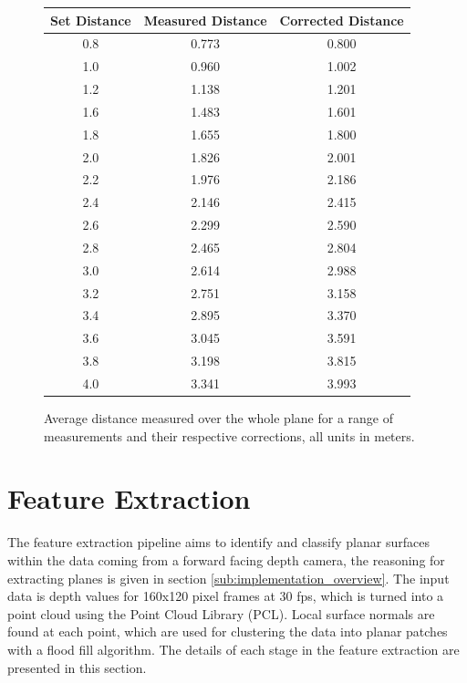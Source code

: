 \documentclass[]{article}
\begin{document}
{\begin{figure}[htb]
	\begin{center}
	\begin{tabular}{ccc}
		\hline

		\hline
		\textbf{Set Distance}& \textbf{Measured Distance}& \textbf{Corrected Distance} \\
		\hline
		0.8		& 0.773	& 0.800\\
		1.0		& 0.960	& 1.002\\
		1.2 	& 1.138	& 1.201\\
		1.6 	& 1.483	& 1.601\\
		1.8 	& 1.655	& 1.800\\
		2.0 	& 1.826	& 2.001\\
		2.2 	& 1.976	& 2.186\\
		2.4 	& 2.146	& 2.415\\
		2.6 	& 2.299	& 2.590\\
		2.8 	& 2.465	& 2.804\\
		3.0 	& 2.614	& 2.988\\
		3.2 	& 2.751	& 3.158\\
		3.4 	& 2.895	& 3.370\\
		3.6 	& 3.045	& 3.591\\
		3.8 	& 3.198	& 3.815\\
		4.0 	& 3.341	& 3.993\\
		\hline

		\hline
	\end{tabular}
	\end{center}
	\caption{Average distance measured over the whole plane for a range of measurements and their respective corrections, all units in meters.}
	\label{tab:averages}
\end{figure}


\clearpage


\section{Feature Extraction} %
\label{sec:feature_extraction}

The feature extraction pipeline aims to identify and classify planar surfaces within the data coming from a forward facing depth camera, the reasoning for extracting planes is given in section \ref{sub:implementation_overview}. The input data is depth values for 160x120 pixel frames at 30 fps, which is turned into a point cloud using the Point Cloud Library (PCL). Local surface normals are found at each point, which are used for clustering the data into planar patches with a flood fill algorithm. The details of each stage in the feature extraction are presented in this section. 

}
\end{document}
